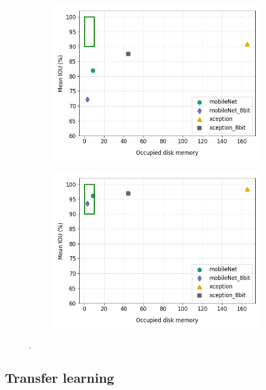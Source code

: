 \begin{figure}[!htb]
\begin{subfigure}{.5\textwidth}
			\includegraphics[width=1\linewidth]{images/q_mem_v_shape}
		\end{subfigure}
		\begin{subfigure}{.5\textwidth}
			\centering
			\includegraphics[width=1\linewidth]{images/q_mem_v_bin}
		\end{subfigure}
		\caption{.}
		\label{Fig:quant}
	\end{figure}

\subsection{Transfer learning}

